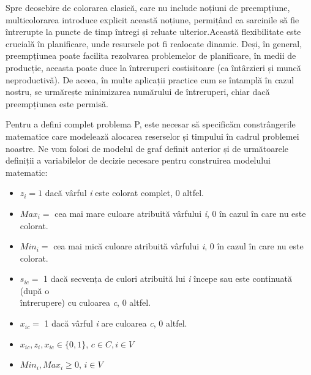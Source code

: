     Spre deosebire de colorarea clasică, care nu include noțiuni de preempțiune, multicolorarea introduce explicit această noțiune, permițând ca sarcinile să fie întrerupte la puncte de timp întregi și reluate ulterior.Această flexibilitate este crucială în planificare, unde resursele pot fi realocate dinamic. Deși, în general, preempțiunea poate facilita rezolvarea problemelor de planificare, în medii de producție, aceasta poate duce la întreruperi costisitoare (ca întârzieri și muncă neproductivă). De aceea, în multe aplicații practice cum se întamplă în cazul nostru, se urmărește minimizarea numărului de întreruperi, chiar dacă preempțiunea este permisă. 

    Pentru a defini complet problema P, este necesar să specificăm constrângerile matematice care modelează alocarea reserselor și timpului în cadrul problemei noastre. Ne vom folosi de modelul de graf definit anterior și de următoarele definiții a variabilelor de  decizie necesare pentru construirea modelului matematic:
   
    \begin{itemize}

      \item $z_i =1 $ dacă vârful \textit{i} este colorat complet, 0 altfel.
      \item $Max_i =$ cea mai mare culoare atribuită vârfului \textit{i}, 0 în cazul în care nu este colorat.
      
      \item $Min_i =$ cea mai mică culoare atribuită vârfului \textit{i}, 0 în cazul în care nu este colorat.
      \item $s_{ic} = $ 1 dacă secvența de culori atribuită lui \textit{i} începe sau este continuată (după o \\
      întrerupere) cu culoarea \textit{c}, 0 altfel.
      \item $x_{ic} =$ 1 dacă vârful \textit{i} are culoarea \textit{c}, 0 altfel.
      \item $x_{ic},z_i,x_{ic} \in \{0,1\}$, $c \in C, i \in V$
      \item $Min_i, Max_i \geq 0$, $i \in V$
    \end{itemize}
 
